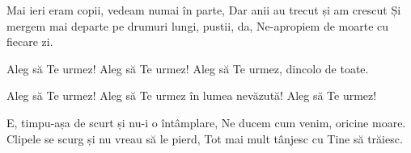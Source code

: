 \beginverse
Mai ieri eram copii, vedeam numai în parte,
Dar anii au trecut și am crescut
Și mergem mai departe pe drumuri lungi, pustii, da,
Ne-apropiem de moarte cu fiecare zi.
\endverse

\beginchorus
Aleg să Te urmez! Aleg să Te urmez!
Aleg să Te urmez, dincolo de toate.
\endchorus

\beginverse*
Aleg să Te urmez!
Aleg să Te urmez în lumea nevăzută!
Aleg să Te urmez!
\endverse

\beginverse
E, timpu-așa de scurt și nu-i o întâmplare,
Ne ducem cum venim, oricine moare.
Clipele se scurg și nu vreau să le pierd,
Tot mai mult tânjesc cu Tine să trăiesc.
\endverse
\endsong